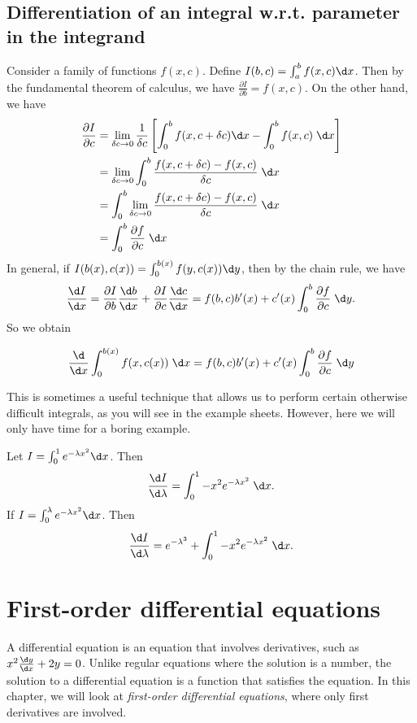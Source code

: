 \documentclass[a4paper]{article}
\begin{document}
\subsection{Differentiation of an integral w.r.t. parameter in the integrand}
Consider a family of functions $f(x, c)$. Define $I(b, c) = \int_a^bf(x, c)\d x$. Then by the fundamental theorem of calculus, we have $\frac{\partial I}{\partial b} = f(x, c)$. On the other hand, we have
\begin{align*}
  \frac{\partial I}{\partial c} &= \lim_{\delta c\to 0}\frac{1}{\delta c}\left[\int_0^bf(x, c + \delta c)\d x - \int_0^b f(x, c)\;\d x\right]\\
  &= \lim_{\delta c\to 0}\int_0^b\frac{f(x, c + \delta c) - f(x, c)}{\delta c}\;\d x\\
  &= \int_0^b\lim_{\delta c\to 0}\frac{f(x, c + \delta c) - f(x, c)}{\delta c}\;\d x\\
  &= \int_0^b\frac{\partial f}{\partial c}\;\d x
\end{align*}
In general, if $I(b(x), c(x)) = \int_0^{b(x)} f(y, c(x))\d y$, then by the chain rule, we have
\[
  \frac{\d I}{\d x} = \frac{\partial I}{\partial b}\frac{\d b}{\d x} + \frac{\partial I}{\partial c}\frac{\d c}{\d x} = f(b, c)b'(x) + c'(x) \int_0^b\frac{\partial f}{\partial c}\;\d y.
\]
So we obtain

\begin{thm}
  \[
    \frac{\d}{\d x} \int_{0}^{b(x)} f(x, c(x))\;\d x= f(b, c)b'(x) + c'(x)\int_0^b \frac{\partial f}{\partial c}\;\d y
  \]
\end{thm}
This is sometimes a useful technique that allows us to perform certain otherwise difficult integrals, as you will see in the example sheets. However, here we will only have time for a boring example.

\begin{eg}
  Let $I = \int_0^1 e^{-\lambda x^2}\d x$. Then
  \[
    \frac{\d I}{\d \lambda} = \int_0^1-x^2e^{-\lambda x^2}\;\d x.
  \]
  If $I = \int_0^\lambda e^{-\lambda x^2}\d x$. Then
  \[
    \frac{\d I}{\d \lambda} = e^{-\lambda^3} + \int_0^1-x^2e^{-\lambda x^2}\;\d x.
  \]
\end{eg}

\section{First-order differential equations}
A differential equation is an equation that involves derivatives, such as $x^2\frac{\d y}{\d x} + 2y = 0$. Unlike regular equations where the solution is a number, the solution to a differential equation is a function that satisfies the equation. In this chapter, we will look at \emph{first-order differential equations}, where only first derivatives are involved.
\end{document}
